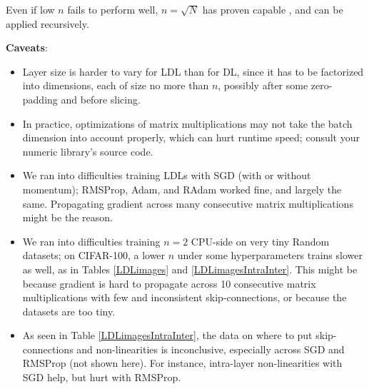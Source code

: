 \documentclass{article}
\begin{document}
Even if low $n$ fails to perform well, $n=\sqrt{N}$ has proven capable \cite{tolstikhin2021mlpmixer}, and can be applied recursively.

\begin{minipage}{\linewidth}
\textbf{Caveats}:
\begin{itemize}
\item Layer size is harder to vary for LDL than for DL, since it has to be factorized into dimensions, each of size no more than $n$, possibly after some zero-padding and before slicing.
\item In practice, optimizations of matrix multiplications may not take the batch dimension into account properly, which can hurt runtime speed; consult your numeric library's source code.
\item We ran into difficulties training LDLs with SGD (with or without momentum); RMSProp, Adam, and RAdam worked fine, and largely the same. Propagating gradient across many consecutive matrix multiplications might be the reason.
\item We ran into difficulties training $n=2$ CPU-side on very tiny Random datasets; on CIFAR-100, a lower $n$ under some hyperparameters trains slower as well, as in Tables \ref{LDLimages} and \ref{LDLimagesIntraInter}. This might be because gradient is hard to propagate across 10 consecutive matrix multiplications with few and inconsistent skip-connections, or because the datasets are too tiny.
\item As seen in Table \ref{LDLimagesIntraInter}, the data on where to put skip-connections and non-linearities is inconclusive, especially across SGD and RMSProp (not shown here). For instance, intra-layer non-linearities with SGD help, but hurt with RMSProp.
\end{itemize}
\end{minipage}
\end{document}
